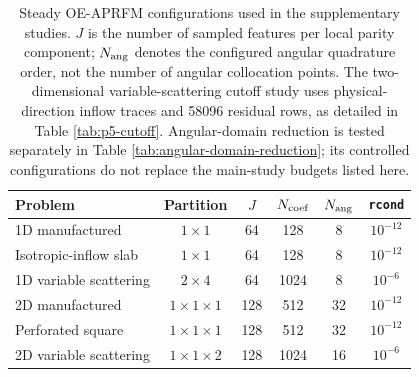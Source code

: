 \begin{table}[!htb]
\centering
\small
\setlength{\tabcolsep}{3pt}
\caption{Periodic transport at $t=0.2$ with $\Delta t=0.002$. Values are three-seed medians,
and both RFM methods use 256 coefficients. CT and BE denote continuous-time and same-step backward-Euler transport references.}
\label{tab:transient-comparison}
\end{table}

\begin{table}[!htb]
\centering\small
\setlength{\tabcolsep}{3.5pt}
\caption{Steady OE-APRFM configurations used in the supplementary studies. $J$ is the number of sampled features per local parity component; $N_{\rm ang}$ denotes the configured angular quadrature order, not the number of angular collocation points. The two-dimensional variable-scattering cutoff study uses physical-direction inflow traces and 58096 residual rows, as detailed in Table \ref{tab:p5-cutoff}. Angular-domain reduction is tested separately in Table \ref{tab:angular-domain-reduction}; its controlled configurations do not replace the main-study budgets listed here.}
\label{tab:supp-configurations}
\begin{tabular}{lccccc}
\toprule
Problem & Partition & $J$ & $N_{\rm coef}$ & $N_{\rm ang}$ & \texttt{rcond}\\
\midrule
1D manufactured & $1\times1$ & 64 & 128 & 8 & $10^{-12}$\\
Isotropic-inflow slab & $1\times1$ & 64 & 128 & 8 & $10^{-12}$\\
1D variable scattering & $2\times4$ & 64 & 1024 & 8 & $10^{-6}$\\
2D manufactured & $1\times1\times1$ & 128 & 512 & 32 & $10^{-12}$\\
Perforated square & $1\times1\times1$ & 128 & 512 & 32 & $10^{-12}$\\
2D variable scattering & $1\times1\times2$ & 128 & 1024 & 16 & $10^{-6}$\\
\bottomrule
\end{tabular}
\end{table}

